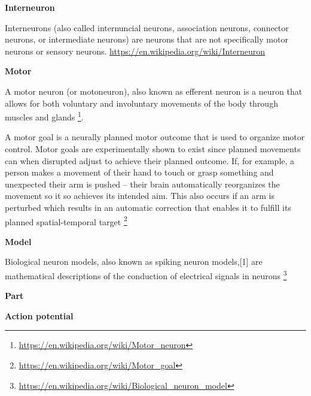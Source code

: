 \documentclass{book}
\providecommand{\ProjectDeepHeading}[2]{%
    \par\medskip\noindent\textbf{#2}\par\smallskip
}
\providecommand{\seeherefooter}[1]{\footnote{\url{#1}}}
\begin{document}
\ProjectDeepHeading{5}{Interneuron}


Interneurons (also called internuncial neurons, association neurons, connector neurons, or intermediate neurons) are neurons that are not specifically motor neurons or sensory neurons. \url{https://en.wikipedia.org/wiki/Interneuron}

\ProjectDeepHeading{5}{Motor}


A motor neuron (or motoneuron), also known as efferent neuron is a neuron that allows for both voluntary and involuntary movements of the body through muscles and glands \seeherefooter{https://en.wikipedia.org/wiki/Motor_neuron}.


A motor goal is a neurally planned motor outcome that is used to organize motor control.
    Motor goals are experimentally shown to exist since planned movements can when disrupted adjust to achieve their planned outcome. If, for example, a person makes a movement of their hand to touch or grasp something and unexpected their arm is pushed – their brain automatically reorganizes the movement so it so achieves its intended aim. This also occurs if an arm is perturbed which results in an automatic correction that enables it to fulfill its planned spatial-temporal target \seeherefooter{https://en.wikipedia.org/wiki/Motor_goal}

\ProjectDeepHeading{4}{Model}


Biological neuron models, also known as spiking neuron models,[1] are mathematical descriptions of the conduction of electrical signals in neurons \seeherefooter{https://en.wikipedia.org/wiki/Biological_neuron_model}

\ProjectDeepHeading{4}{Part}

\ProjectDeepHeading{5}{Action potential}

\end{document}
